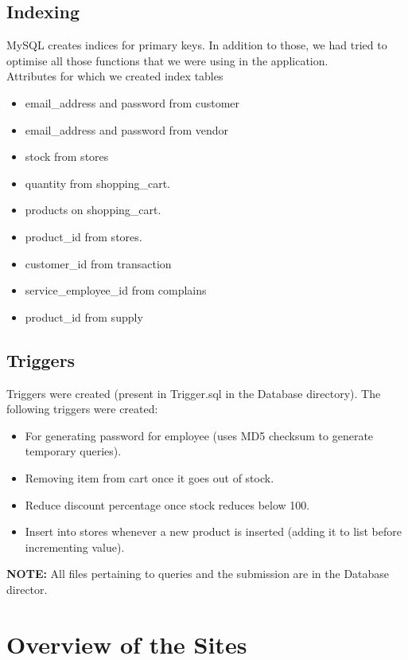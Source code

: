 \documentclass[12pt]{report}
\begin{document}
    \section*{Indexing}
        MySQL creates indices for primary keys. In addition to those, we had tried to optimise all those functions that we were using in the application. \\
        Attributes for which we created index tables
        \begin{itemize}
            \item email\_address and password from customer
            \item email\_address and password from vendor
            \item stock from stores
            \item quantity from shopping\_cart.
            \item products on shopping\_cart.
            \item product\_id from stores.
            \item customer\_id from transaction
            \item service\_employee\_id from complains
            \item product\_id from supply
        \end{itemize}
    
    \section*{Triggers}
        Triggers were created (present in Trigger.sql in the Database directory). The following triggers were created:
        \begin{itemize}
            \item For generating password for employee (uses MD5 checksum to generate temporary queries).
            \item Removing item from cart once it goes out of stock.
            \item Reduce discount percentage once stock reduces below 100.
            \item Insert into stores whenever a new product is inserted (adding it to list before incrementing value).
        \end{itemize}
    
    \textbf{NOTE:} All files pertaining to queries and the submission are in the Database director.

\chapter*{Overview of the Sites}
\end{document}

